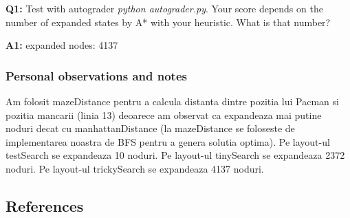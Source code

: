 \textbf{Q1:} Test  with  autograder \textit{python autograder.py}. Your score depends on the number of expanded states by A* with your heuristic. What is that number?

\textbf{A1:} expanded nodes: 4137 %


\subsubsection{Personal observations and notes}
Am folosit mazeDistance pentru a calcula distanta dintre pozitia lui Pacman si pozitia mancarii (linia 13) deoarece am observat ca expandeaza mai putine noduri decat cu manhattanDistance (la mazeDistance se foloseste de implementarea noastra de BFS pentru a genera solutia optima). \newline
Pe layout-ul testSearch se expandeaza 10 noduri. \newline
Pe layout-ul tinySearch se expandeaza 2372 noduri. \newline
Pe layout-ul trickySearch se expandeaza 4137 noduri. %

\vspace{0.75cm}

\subsection{References}

